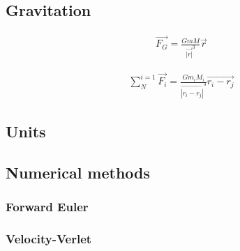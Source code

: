 \subsection{Gravitation}


\begin{align}
	\vec{F_G}  =\frac{GmM}{\vec{|r|}^3}\vec{r}
\end{align}

\begin{align*}
\sum_{N}^{i = 1} 
\vec{F_i}  
=
\frac{Gm_iM_i}
{\vec{|r_i - r_j|}^3}
\vec{r_i - r_j}
\end{align*}
\subsection{Units}



\subsection{Numerical methods}

\subsubsection{Forward Euler}

\subsubsection{Velocity-Verlet}
